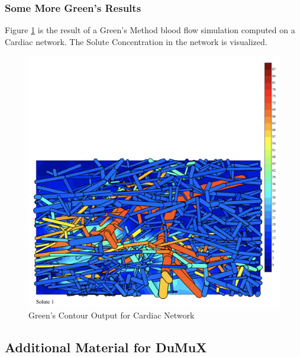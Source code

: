 \subsubsection{Some More Green's Results}

Figure \ref{fig:Contour_Cardiac}  is the result of a Green's Method blood flow simulation computed on a Cardiac network. The Solute Concentration in the network is visualized.\\
\begin{figure}[h]
\centering
\includegraphics[width=170mm]{Contour_Cardiac}
\caption{Green's Contour Output for Cardiac Network}
\label{fig:Contour_Cardiac}
\end{figure}

\subsection{Additional Material for DuMuX}



